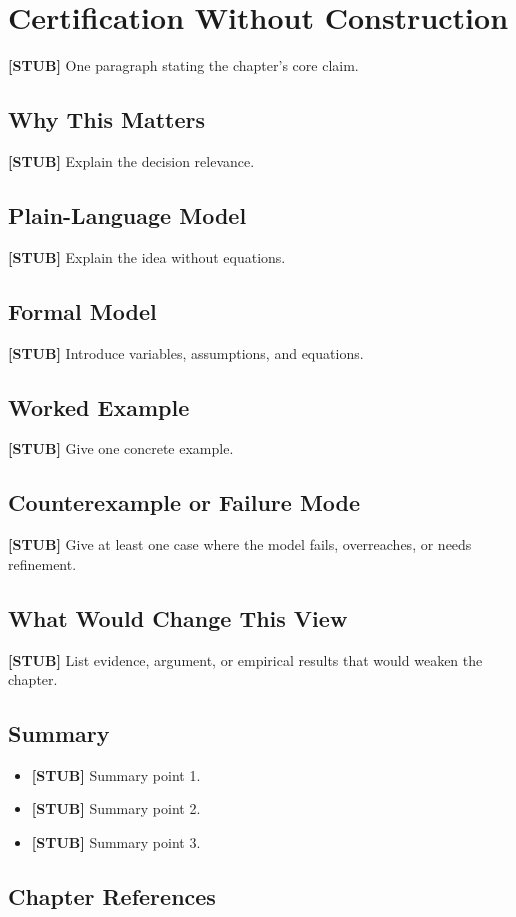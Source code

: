 \chapter{Certification Without Construction}
\label{ch:certification-without-construction}

\begin{chapterthesis}
\textbf{[STUB]} One paragraph stating the chapter's core claim.
\end{chapterthesis}

\section{Why This Matters}

\textbf{[STUB]} Explain the decision relevance.

\section{Plain-Language Model}

\textbf{[STUB]} Explain the idea without equations.

\section{Formal Model}

\textbf{[STUB]} Introduce variables, assumptions, and equations.

\section{Worked Example}

\textbf{[STUB]} Give one concrete example.

\section{Counterexample or Failure Mode}

\textbf{[STUB]} Give at least one case where the model fails, overreaches, or needs refinement.

\section{What Would Change This View}

\textbf{[STUB]} List evidence, argument, or empirical results that would weaken the chapter.

\section{Summary}

\begin{itemize}
  \item \textbf{[STUB]} Summary point 1.
  \item \textbf{[STUB]} Summary point 2.
  \item \textbf{[STUB]} Summary point 3.
\end{itemize}

\section*{Chapter References}

